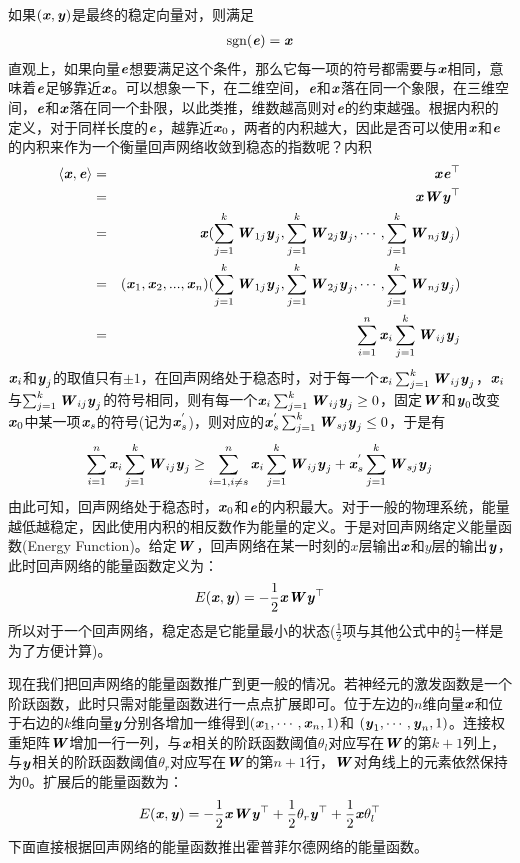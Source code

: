 如果$(\Vx,\Vy)$是最终的稳定向量对，则满足
\begin{eqnarray}
\mathop{\rm sgn}(\Ve) = \Vx\nonumber
\end{eqnarray}
直观上，如果向量$\Ve$想要满足这个条件，那么它每一项的符号都需要与$\Vx$相同，意味着$\Ve$足够靠近$\Vx$。可以想象一下，在二维空间，$\Ve$和$\Vx$落在同一个象限，在三维空间，$\Ve$和$\Vx$落在同一个卦限，以此类推，维数越高则对$\Ve$的约束越强。根据内积的定义，对于同样长度的$\Ve$，越靠近$\Vx_{0}$，两者的内积越大，因此是否可以使用$\Vx$和$\Ve$的内积来作为一个衡量回声网络收敛到稳态的指数呢？内积
\begin{eqnarray}
\langle\Vx,\Ve\rangle 
&=& \Vx\Ve^\top\nonumber\\
&=& \Vx\MW\Vy^\top\nonumber\\
&=& \Vx(\sum_{j=1}^{k}\MW_{1j}\Vy_{j},\sum_{j=1}^{k}\MW_{2j}\Vy_{j},\cdots,\sum_{j=1}^{k}\MW_{nj}\Vy_{j})\nonumber\\
&=& (\Vx_{1},\Vx_{2},...,\Vx_{n})(\sum_{j=1}^{k}\MW_{1j}\Vy_{j},\sum_{j=1}^{k}\MW_{2j}\Vy_{j},\cdots,\sum_{j=1}^{k}\MW_{nj}\Vy_{j})\nonumber\\
&=& \sum_{i=1}^{n}\Vx_{i}\sum_{j=1}^{k}\MW_{ij}\Vy_{j}\nonumber
\end{eqnarray}
$\Vx_{i}$和$\Vy_{j}$的取值只有$\pm1$，在回声网络处于稳态时，对于每一个$\Vx_{i}\sum_{j=1}^{k}\MW_{ij}\Vy_{j}$，$\Vx_{i}$与$\sum_{j=1}^{k}\MW_{ij}\Vy_{j}$的符号相同，则有每一个$\Vx_{i}\sum_{j=1}^{k}\MW_{ij}\Vy_{j}\geq0$，固定$\MW$和$\Vy_{0}$改变$\Vx_{0}$中某一项$\Vx_{s}$的符号(记为$\Vx_{s}^{'}$)，则对应的$\Vx_{s}^{'}\sum_{j=1}^{k}\MW_{sj}\Vy_{j}\leq0$，于是有
\begin{eqnarray}
\sum_{i=1}^{n}\Vx_{i}\sum_{j=1}^{k}\MW_{ij}\Vy_{j} \geq \sum_{i=1,i\neq s}^{n}\Vx_{i}\sum_{j=1}^{k}\MW_{ij}\Vy_{j} + \Vx_{s}^{'}\sum_{j=1}^{k}\MW_{sj}\Vy_{j}\nonumber
\end{eqnarray}
由此可知，回声网络处于稳态时，$\Vx_{0}$和$\Ve$的内积最大。对于一般的物理系统，能量越低越稳定，因此使用内积的相反数作为能量的定义。于是对回声网络定义能量函数(Energy Function)。给定$\MW$，回声网络在某一时刻的$x$层输出$\Vx$和$y$层的输出$\Vy$，此时回声网络的能量函数定义为：
\begin{eqnarray}
E(\Vx,\Vy) = -\frac{1}{2}\Vx\MW\Vy^\top
\end{eqnarray}
所以对于一个回声网络，稳定态是它能量最小的状态($\frac{1}{2}$项与其他公式中的$\frac{1}{2}$一样是为了方便计算)。

现在我们把回声网络的能量函数推广到更一般的情况。若神经元的激发函数是一个阶跃函数，此时只需对能量函数进行一点点扩展即可。位于左边的$n$维向量$\Vx$和位于右边的$k$维向量$\Vy$分别各增加一维得到$(\Vx_{1},\cdots,\Vx_{n},1)$和 $(\Vy_{1},\cdots,\Vy_{n},1)$。连接权重矩阵$\MW$增加一行一列，与$\Vx$相关的阶跃函数阈值$\theta_{l}$对应写在$\MW$的第$k+1$列上，与$\Vy$相关的阶跃函数阈值${\theta_{r}}$对应写在$\MW$的第$n+1$行，$\MW$对角线上的元素依然保持为$0$。扩展后的能量函数为：
\begin{eqnarray}
E(\Vx,\Vy) = -\frac{1}{2}\Vx\MW\Vy^\top + \frac{1}{2}\theta_{r}\Vy^\top + \frac{1}{2}\Vx\theta_{l}^\top
\end{eqnarray}
下面直接根据回声网络的能量函数推出霍普菲尔德网络的能量函数。


